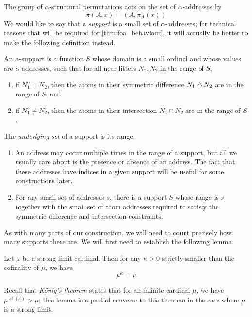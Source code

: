 The group of \( \alpha \)-structural permutations acts on the set of \( \alpha \)-addresses by
\[ \pi(A, x) = (A, \pi_A(x)) \]
We would like to say that a \emph{support} is a small set of \( \alpha \)-addresses; for technical reasons that will be required for \cref{thm:foa_behaviour}, it will actually be better to make the following definition instead.
\begin{definition}
    An \( \alpha \)-support is a function \( S \) whose domain is a small ordinal and whose values are \( \alpha \)-addresses, such that for all near-litters \( N_1, N_2 \) in the range of \( S \),
    \begin{enumerate}
        \item if \( N_1^\circ = N_2^\circ \), then the atoms in their symmetric difference \( N_1 \symmdiff N_2 \) are in the range of \( S \); and
        \item if \( N_1^\circ \neq N_2^\circ \), then the atoms in their intersection \( N_1 \cap N_2 \) are in the range of \( S \).
    \end{enumerate}
    The \emph{underlying set} of a support is its range.
\end{definition}
\begin{remarks}\mbox{\negthinspace}
    \begin{enumerate}
        \item An address may occur multiple times in the range of a support, but all we usually care about is the presence or absence of an address.
        The fact that these addresses have indices in a given support will be useful for some constructions later.
        \item For any small set of addresses \( s \), there is a support \( S \) whose range is \( s \) together with the small set of atom addresses required to satisfy the symmetric difference and intersection constraints.
    \end{enumerate}
\end{remarks}
As with many parts of our construction, we will need to count precisely how many supports there are.
We will first need to establish the following lemma.
\begin{lemma}
    \label{lem:konig_converse}
    Let \( \mu \) be a strong limit cardinal.
    Then for any \( \kappa > 0 \) strictly smaller than the cofinality of \( \mu \), we have
    \[ \mu^\kappa = \mu \]
\end{lemma}
Recall that \emph{König's theorem} states that for an infinite cardinal \( \mu \), we have \( \mu^{\operatorname{cf}(\kappa)} > \mu \); this lemma is a partial converse to this theorem in the case where \( \mu \) is a strong limit.

